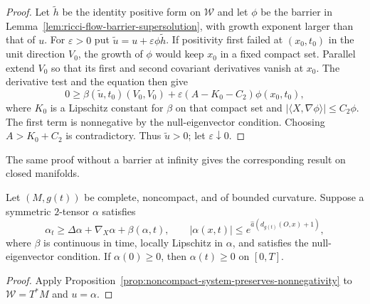 \begin{proof}
\sketch
{}
Let $\widetilde h$ be the identity positive form on $\mathcal W$ and let
$\phi$ be the barrier in Lemma~\ref{lem:ricci-flow-barrier-supersolution},
with growth exponent larger than that of $u$.  For $\varepsilon>0$ put
$\widetilde u=u+\varepsilon\phi\widetilde h$.  If positivity first failed at
$(x_0,t_0)$ in the unit direction $V_0$, the growth of $\phi$ would keep
$x_0$ in a fixed compact set.  Parallel extend $V_0$ so that its first and
second covariant derivatives vanish at $x_0$.  The derivative test and the
equation then give
\[
0\geq \beta(\widetilde u,t_0)(V_0,V_0)
+\varepsilon(A-K_0-C_2)\phi(x_0,t_0),
\]
where $K_0$ is a Lipschitz constant for $\beta$ on that compact set and
$|\langle X,\nabla\phi\rangle|\leq C_2\phi$.  The first term is nonnegative
by the null-eigenvector condition.  Choosing $A>K_0+C_2$ is contradictory.
Thus $\widetilde u>0$; let $\varepsilon\downarrow0$.
\end{proof}

\begin{remark}
\label{rem:system-wmp-closed-manifolds}


The same proof without a barrier at infinity gives the corresponding result
on closed manifolds.
\end{remark}

\begin{theorem}
\label{thm:noncompact-two-tensor-maximum-principle}

Let $(M,g(t))$ be complete, noncompact, and of bounded curvature.  Suppose a
symmetric $2$-tensor $\alpha$ satisfies
\[
\alpha_t\geq\Delta\alpha+\nabla_X\alpha+\beta(\alpha,t),
\qquad
|\alpha(x,t)|\leq e^{\widehat a(d_{g(t)}(O,x)+1)},
\]
where $\beta$ is continuous in time, locally Lipschitz in $\alpha$, and
satisfies the null-eigenvector condition.  If $\alpha(0)\geq0$, then
$\alpha(t)\geq0$ on $[0,T]$.
\end{theorem}

\begin{proof}
\sketch
{}
Apply Proposition~\ref{prop:noncompact-system-preserves-nonnegativity} to
$\mathcal W=T^*M$ and $u=\alpha$.
\end{proof}

